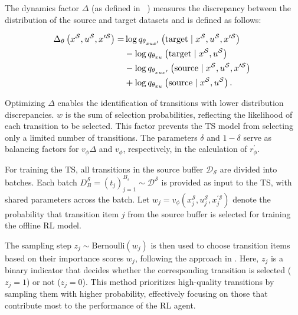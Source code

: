 The dynamics factor $\Delta$ (as defined in ~\citep{eysenbach2020off}) measures the discrepancy between the distribution of the source and target datasets and is defined as follows:

\begin{equation}
\label{eq-delata}
\resizebox{0.70\hsize}{!}{%
\begin{math}
\begin{aligned}
\Delta_\theta\left(x^{\mathcal{S}}, u^{\mathcal{S}}, x^{\prime \mathcal{S}}\right)= & \log q_{\theta_{x u x^{\prime}}}\left(\operatorname{target} \mid x^{\mathcal{S}}, u^{\mathcal{S}}, x^{\prime \mathcal{S}}\right) \\
& -\log q_{\theta_{x u}}\left(\operatorname{target} \mid x^{\mathcal{S}}, u^{\mathcal{S}}\right) \\
& -\log q_{\theta_{x u x^{\prime}}}\left(\operatorname{source} \mid x^{\mathcal{S}}, u^{\mathcal{S}}, x^{\prime \mathcal{S}}\right) \\
& +\log q_{\theta_{x u}}\left(\operatorname{source} \mid x^{\mathcal{S}}, u^{\mathcal{S}}\right).
\end{aligned}
\end{math}
}
\end{equation}


\color{black}

Optimizing $\Delta$ enables the identification of transitions with lower distribution discrepancies. $w$ is the sum of selection probabilities, reflecting the likelihood of each transition to be selected. This factor prevents the TS model from selecting only a limited number of transitions. The parameters \(\delta\) and \(1-\delta\) serve as balancing factors for $v_{\phi}  \Delta$ and \(v_{\phi}\), respectively, in the calculation of \(r^{\prime}_\phi\).


For training the TS, all transitions in the source buffer \(\mathcal{D}_{\mathcal{S}}\) are divided into batches. Each batch \(D_B^{\mathcal{S}} = \left(t_j\right)_{j=1}^{B_s} \sim \mathcal{D}^{\mathcal{S}}\) is provided as input to the TS, with shared parameters across the batch. Let \(w_j = v_\phi\left(x_j^{\mathcal{S}}, u_j^{\mathcal{S}}, x_j^{\prime \mathcal{S}}\right)\) denote the probability that transition item \(j\) from the source buffer is selected for training the offline RL model. 


The sampling step \(z_j \sim \text{Bernoulli}(w_j)\) is then used to choose transition items based on their importance scores \(w_j\), following the approach in \citep{yoon2020data}. Here, $z_j$ is a binary indicator that decides whether the corresponding transition is selected ($z_j=1$) or not ($z_j=0$). This method prioritizes high-quality transitions by sampling them with higher probability, effectively focusing on those that contribute most to the performance of the RL agent.


